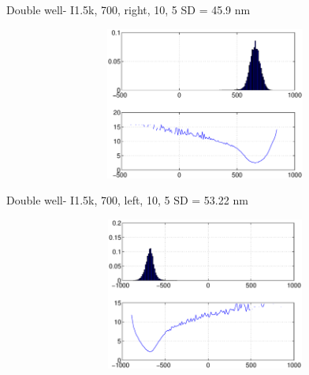 \documentclass{beamer}
\begin{document}
\begin{frame}{Double well- I1.5k, 700, right, 10, 5} 
SD = 45.9 nm
\begin{figure}
    \centering
    \includegraphics[height=5cm,width=12cm]{right_well_1_5k_700_3.eps}
    \label{fig:graph6}
\end{figure}


\end{frame}

\begin{frame}{Double well- I1.5k, 700, left, 10, 5} 
SD = 53.22 nm 
\begin{figure}
    \centering
    \includegraphics[height=5cm,width=12cm]{left_well_1_5k_700_9.eps}
    \label{fig:graph7}
\end{figure}


\end{frame}
\end{document}
